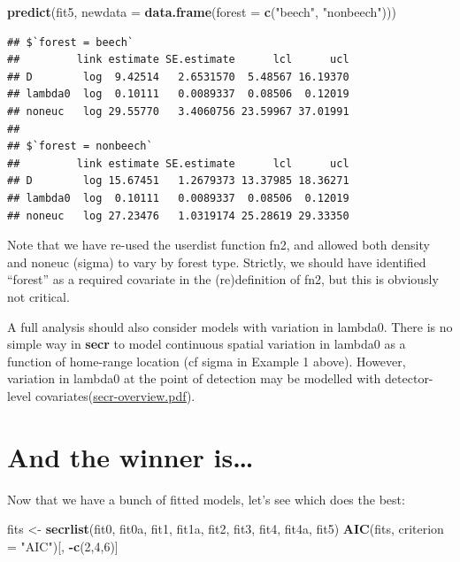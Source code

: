 \documentclass[
]{book}
\newenvironment{Shaded}{\begin{snugshade}}{\end{snugshade}}
\newcommand{\AttributeTok}[1]{\textcolor[rgb]{0.13,0.29,0.53}{#1}}
\newcommand{\DecValTok}[1]{\textcolor[rgb]{0.00,0.00,0.81}{#1}}
\newcommand{\FunctionTok}[1]{\textcolor[rgb]{0.13,0.29,0.53}{\textbf{#1}}}
\newcommand{\NormalTok}[1]{#1}
\newcommand{\OtherTok}[1]{\textcolor[rgb]{0.56,0.35,0.01}{#1}}
\newcommand{\SpecialCharTok}[1]{\textcolor[rgb]{0.81,0.36,0.00}{\textbf{#1}}}
\newcommand{\StringTok}[1]{\textcolor[rgb]{0.31,0.60,0.02}{#1}}
\begin{document}
\begin{Shaded}
\begin{Highlighting}[]
\FunctionTok{predict}\NormalTok{(fit5, }\AttributeTok{newdata =} 
    \FunctionTok{data.frame}\NormalTok{(}\AttributeTok{forest =} \FunctionTok{c}\NormalTok{(}\StringTok{"beech"}\NormalTok{, }\StringTok{"nonbeech"}\NormalTok{)))}
\end{Highlighting}
\end{Shaded}

\begin{verbatim}
## $`forest = beech`
##         link estimate SE.estimate      lcl      ucl
## D        log  9.42514   2.6531570  5.48567 16.19370
## lambda0  log  0.10111   0.0089337  0.08506  0.12019
## noneuc   log 29.55770   3.4060756 23.59967 37.01991
## 
## $`forest = nonbeech`
##         link estimate SE.estimate      lcl      ucl
## D        log 15.67451   1.2679373 13.37985 18.36271
## lambda0  log  0.10111   0.0089337  0.08506  0.12019
## noneuc   log 27.23476   1.0319174 25.28619 29.33350
\end{verbatim}

Note that we have re-used the userdist function fn2, and allowed both density and noneuc (sigma) to vary by forest type. Strictly, we should have identified ``forest'' as a required covariate in the (re)definition of fn2, but this is obviously not critical.

A full analysis should also consider models with variation in lambda0. There is no simple way in \textbf{secr} to model continuous spatial variation in lambda0 as a function of home-range location (cf sigma in Example 1 above). However, variation in lambda0 at the point of detection may be modelled with detector-level covariates(\href{https://www.otago.ac.nz/density/pdfs/secr-overview.pdf}{secr-overview.pdf}).

\section{And the winner is\ldots{}}\label{and-the-winner-is}

Now that we have a bunch of fitted models, let's see which does the best:

\begin{Shaded}
\begin{Highlighting}[]
\NormalTok{fits }\OtherTok{\textless{}{-}} \FunctionTok{secrlist}\NormalTok{(fit0, fit0a, fit1, fit1a, fit2, fit3, fit4, }
\NormalTok{                 fit4a, fit5)}
\FunctionTok{AIC}\NormalTok{(fits, }\AttributeTok{criterion =} \StringTok{"AIC"}\NormalTok{)[, }\SpecialCharTok{{-}}\FunctionTok{c}\NormalTok{(}\DecValTok{2}\NormalTok{,}\DecValTok{4}\NormalTok{,}\DecValTok{6}\NormalTok{)]}
\end{Highlighting}
\end{Shaded}
\end{document}
